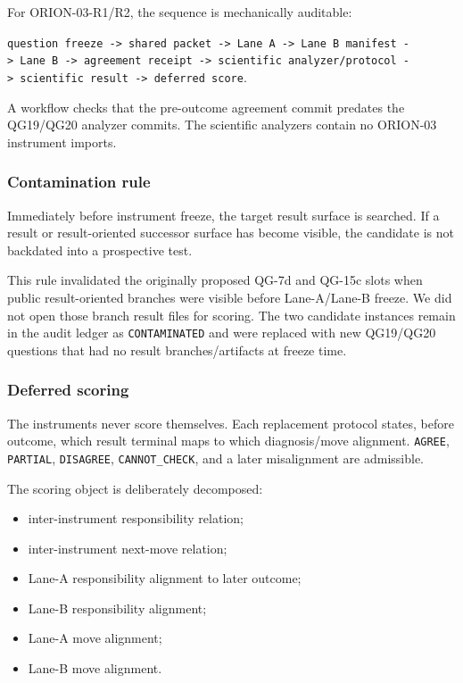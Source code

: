 \documentclass[10pt]{article}
\providecommand{\tightlist}{%
  \setlength{\itemsep}{0pt}\setlength{\parskip}{0pt}}
\begin{document}
For ORION-03-R1/R2, the sequence is mechanically auditable:

\texttt{question\ freeze\ -\textgreater{}\ shared\ packet\ -\textgreater{}\ Lane\ A\ -\textgreater{}\ Lane\ B\ manifest\ -\textgreater{}\ Lane\ B\ -\textgreater{}\ agreement\ receipt\ -\textgreater{}\ scientific\ analyzer/protocol\ -\textgreater{}\ scientific\ result\ -\textgreater{}\ deferred\ score}.

A workflow checks that the pre-outcome agreement commit predates the
QG19/QG20 analyzer commits. The scientific analyzers contain no ORION-03
instrument imports.

\hypertarget{contamination-rule}{%
\subsubsection{Contamination rule}\label{contamination-rule}}

Immediately before instrument freeze, the target result surface is
searched. If a result or result-oriented successor surface has become
visible, the candidate is not backdated into a prospective test.

This rule invalidated the originally proposed QG-7d and QG-15c slots
when public result-oriented branches were visible before Lane-A/Lane-B
freeze. We did not open those branch result files for scoring. The two
candidate instances remain in the audit ledger as \texttt{CONTAMINATED}
and were replaced with new QG19/QG20 questions that had no result
branches/artifacts at freeze time.

\hypertarget{deferred-scoring}{%
\subsubsection{Deferred scoring}\label{deferred-scoring}}

The instruments never score themselves. Each replacement protocol
states, before outcome, which result terminal maps to which
diagnosis/move alignment. \texttt{AGREE}, \texttt{PARTIAL},
\texttt{DISAGREE}, \texttt{CANNOT\_CHECK}, and a later misalignment are
admissible.

The scoring object is deliberately decomposed:

\begin{itemize}
\tightlist
\item
  inter-instrument responsibility relation;
\item
  inter-instrument next-move relation;
\item
  Lane-A responsibility alignment to later outcome;
\item
  Lane-B responsibility alignment;
\item
  Lane-A move alignment;
\item
  Lane-B move alignment.
\end{itemize}
\end{document}
